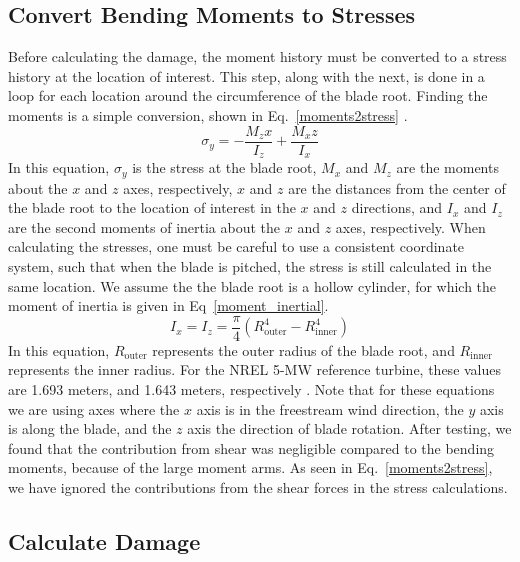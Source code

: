 \documentclass[11pt,letterpaper]{article}
\begin{document}
\subsection{Convert Bending Moments to Stresses}
Before calculating the damage, the moment history must be converted to a stress history at the location of interest. This step, along with the next, is done in a loop for each location around the circumference of the blade root. Finding the moments is a simple conversion, shown in Eq.~\ref{moments2stress} \cite{budynas2020shigley}.
% 
\begin{equation}
    \sigma_y = -\frac{M_z x}{I_z} + \frac{M_x z}{I_x}
    \label{moments2stress}
\end{equation}
% 
In this equation, $\sigma_y$ is the stress at the blade root, $M_x$ and $M_z$ are the moments about the $x$ and $z$ axes, respectively, $x$ and $z$ are the distances from the center of the blade root to the location of interest in the $x$ and $z$ directions, and $I_x$ and $I_z$ are the second moments of inertia about the $x$ and $z$ axes, respectively. When calculating the stresses, one must be careful to use a consistent coordinate system, such that when the blade is pitched, the stress is still calculated in the same location. We assume the the blade root is a hollow cylinder, for which the moment of inertia is given in Eq~\ref{moment_inertial}.
% 
\begin{equation}
    I_x = I_z = \frac{\pi}{4} (R_\text{outer}^4 - R_\text{inner}^4)
    \label{moment_inertial}
\end{equation}
% 
In this equation, $R_\text{outer}$ represents the outer radius of the blade root, and $R_\text{inner}$ represents the inner radius. For the NREL 5-MW reference turbine, these values are 1.693 meters, and 1.643 meters, respectively \cite{resor2013definition}. Note that for these equations we are using axes where the $x$ axis is in the freestream wind direction, the $y$ axis is along the blade, and the $z$ axis the direction of blade rotation. After testing, we found that the contribution from shear was negligible compared to the bending moments, because of the large moment arms. As seen in Eq.~\ref{moments2stress}, we have ignored the contributions from the shear forces in the stress calculations. 


\subsection{Calculate Damage}
\end{document}
